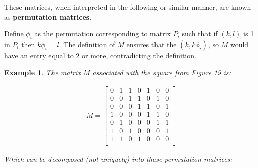 \documentclass[
  11pt,
  a4paper]{book}
\newtheorem{example}{Example}
\begin{document}
These matrices, when interpreted in the following or similar
manner, are known as \textbf{permutation matrices}.

Define \(\phi_i\) as the permutation corresponding to matrix
\(P_i\) such that if \((k,l)\) is 1 in \(P_i\) then \(k\phi _i=l\).
The definition of \(M\) ensures that the \((k,k\phi _i)\), so
\(M\) would have an entry equal to 2 or more, contradicting
the definition.

\begin{example}
The matrix $M$ associated with the square from Figure 19 is:

$$
\begin{gathered}
M=
  \begin{bmatrix}
  0 & 1 & 1 & 0 & 1 & 0 & 0\\
  0 & 0 & 1 & 1 & 0 & 1 & 0\\
  0 & 0 & 0 & 1 & 1 & 0 & 1\\
  1 & 0 & 0 & 0 & 1 & 1 & 0\\
  0 & 1 & 0 & 0 & 0 & 1 & 1\\
  1 & 0 & 1 & 0 & 0 & 0 & 1\\
  1 & 1 & 0 & 1 & 0 & 0 & 0\\
  \end{bmatrix}
\end{gathered}
$$

Which can be decomposed (not uniquely) into these
permutation matrices:


\end{example}
\end{document}
